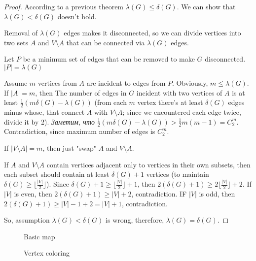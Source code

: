 \documentclass[12pt, a4paper]{article}
\begin{document}
\begin{proof}
According to a previous theorem \(\lambda(G) \le \delta(G)\).
We can show that \(\lambda(G) < \delta(G)\) doesn't hold.

Removal of \(\lambda(G)\) edges makes it disconnected, so we can divide
vertices into two sets \(A\) and \(V \setminus A\) that can be connected via
\(\lambda(G)\) edges.

Let \(P\) be a minimum set of edges that can be removed to make \(G\) disconnected.
\(|P| = \lambda(G)\)

Assume \(m\) vertices from \(A\) are incident to edges from \(P\).
Obviously, \(m \le \lambda(G)\).
If \(|A| = m\), then
The number of edges in \(G\) incident with two vertices of \(A\) is at least
\(\frac12 (m \delta(G) - \lambda(G))\) (from each \(m\) vertex there's at least
\(\delta(G)\) edges minus whose, that connect \(A\) with \(V \setminus A\);
since we encountered each edge twice, divide it by 2).
\textit{\textrussian{Заметим, что}}
\(\frac12 (m \delta(G) - \lambda(G)) > \frac12 m (m - 1) = C_{2}^{m}\).
Contradiction, since maximum number of edges is \(C_{2}^{m}\).

If \(|V \setminus A| = m\), then just "swap" \(A\) and \(V \setminus A\).

If \(A\) and \(V \setminus A\) contain vertices adjacent only to vertices in their own subsets, then each subset should contain at least \(\delta(G) + 1\) vertices (to maintain \(\delta(G) \ge \lfloor \frac{|V|}{2}\rfloor\)).
Since \(\delta(G) + 1 \ge \lfloor \frac{|V|}{2} \rfloor + 1\),
then \(2 (\delta(G) + 1) \ge 2 \lfloor \frac{|V|}{2} \rfloor + 2\).
If \(|V|\) is even, then \(2 (\delta(G) + 1) \ge |V| + 2\), contradiction.
IF \(|V|\) is odd, then \(2 (\delta(G) + 1) \ge |V| - 1 + 2 = |V| + 1\), contradiction.

So, assumption \(\lambda(G) < \delta(G)\) is wrong, therefore, \(\lambda(G) =
\delta(G)\).
\end{proof}


\begin{landscape}
\begin{figure}
\centering

\caption{Basic map}\label{fig:map_basic}
\end{figure}
\end{landscape}

\begin{landscape}
\begin{figure}
\centering

\caption{Vertex coloring}\label{fig:vertex_coloring_map}
\end{figure}
\end{landscape}
\end{document}

